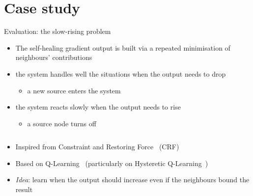 \documentclass[8pt, aspectratio=169, handout]{beamer}
\begin{document}
\section{Case study}
\begin{frame}{Evaluation: the slow-rising problem}
  \begin{card}
    \begin{itemize}
      \item The self-healing gradient output is built via a repeated minimisation of neighbours' contributions
      \item[\success{\faThumbsUp}] the system handles well the situations when the output needs to drop
      \begin{itemize}
        \item a new source enters the system
      \end{itemize}
      \item[\failure{\faThumbsDown}] the system reacts slowly when the output needs to rise
      \begin{itemize}
        \item a source node turns off
      \end{itemize}
    \end{itemize}
  \end{card}
  \begin{columns}
    \begin{column}{0.26\textwidth}
    \end{column}
    \begin{column}{0.26\textwidth}
    \end{column}
    \begin{column}{0.26\textwidth}
    \end{column}
  \end{columns}
  \begin{card}
    \begin{itemize}
      \item Inspired from Constraint and Restoring Force~\cite{DBLP:conf/sac/BealBVT08} (CRF)
      \item Based on Q-Learning~\cite{DBLP:journals/ml/WatkinsD92} (particularly on Hysteretic Q-Learning~\cite{DBLP:conf/iros/MatignonLF07})
      \item \emph{Idea}: learn when the output should increase even if the neighbours bound the result

\end{itemize}
\end{card}
\end{frame}
\end{document}
